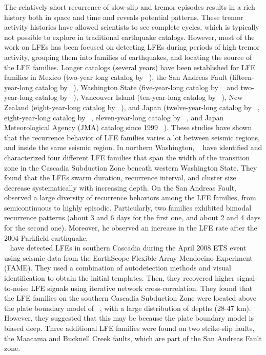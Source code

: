 \documentclass[draft]{agujournal2019}
\begin{document}
The relatively short recurrence of slow-slip and tremor episodes results in a rich history both in space and time and reveals potential patterns.  These tremor activity histories have allowed scientists to see complete cycles, which is typically not possible to explore in traditional earthquake catalogs. However, most of the work on LFEs has been focused on detecting LFEs during periods of high tremor activity, grouping them into families of earthquakes, and locating the source of the LFE families. Longer catalogs (several years) have been established for LFE families in Mexico (two-year long catalog by ~), the San Andreas Fault (fifteen-year-long catalog by ~), Washington State (five-year-long catalog by ~ and two-year-long catalog by ~), Vancouver Island (ten-year-long catalog by ~), New Zealand (eight-year-long catalog by ~), and Japan (twelve-year-long catalog by ~, eight-year-long catalog by ~, eleven-year-long catalog by ~, and Japan Meteorological Agency (JMA) catalog since 1999 ~\cite{KAT_2003}). These studies have shown that the recurrence behavior of LFE families varies a lot between seismic regions, and inside the same seismic region. In northern Washington, ~ have identified and characterized four different LFE families that span the width of the transition zone in the Cascadia Subduction Zone beneath western Washington State. They found that the LFEs swarm duration, recurrence interval, and cluster size decrease systematically with increasing depth. On the San Andreas Fault, ~ observed a large diversity of recurrence behaviors among the LFE families, from semicontinuous to highly episodic. Particularly, two families exhibited bimodal recurrence patterns (about 3 and 6 days for the first one, and about 2 and 4 days for the second one). Moreover, he observed an increase in the LFE rate after the 2004 Parkfield earthquake. \\

~ have detected LFEs in southern Cascadia during the April 2008 ETS event using seismic data from the EarthScope Flexible Array Mendocino Experiment (FAME). They used a combination of autodetection methods and visual identification to obtain the initial templates. Then, they recovered higher signal-to-noise LFE signals using iterative network cross-correlation. They found that the LFE families on the southern Cascadia Subduction Zone were located above the plate boundary model of ~, with a large distribution of depths (28-47 km). However, they suggested that this may be because the plate boundary model is biased deep. Three additional LFE families were found on two strike-slip faults, the Maacama and Bucknell Creek faults, which are part of the San Andreas Fault zone. \\
\end{document}

